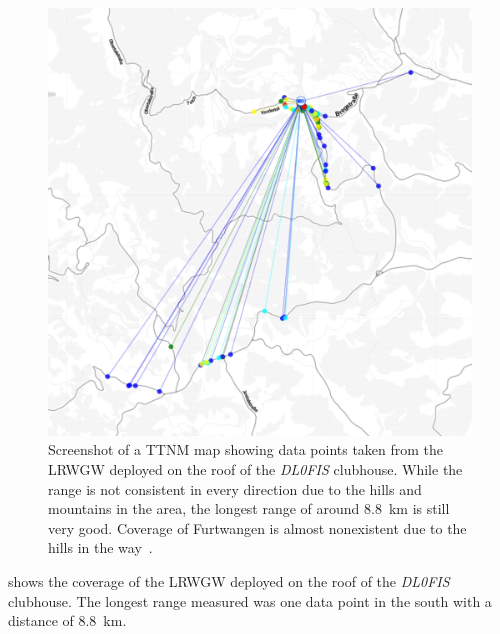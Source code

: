 \begin{figure}[htbp]
    \centering
    \includegraphics[width=1\textwidth]{pictures/ttn-mapper/gateway-ranges/dl0fis_gw_range.jpg}
    \caption{
        Screenshot of a \ac{TTNM} map showing data points taken from the \acl{LRWGW} deployed on the roof of the \emph{DL0FIS} clubhouse.
        While the range is not consistent in every direction due to the hills and mountains in the area, the longest range of around \SI{8.8}{\kilo\meter} is still very good.
        Coverage of Furtwangen is almost nonexistent due to the hills in the way~\cite{ttn_mapper_ttn_2023}.
    }\label{pic:dl0fis_gw_range}
\end{figure}

 shows the coverage of the \acl{LRWGW} deployed on the roof of the \emph{DL0FIS} clubhouse.
The longest range measured was one data point in the south with a distance of \SI{8.8}{\kilo\meter}.

